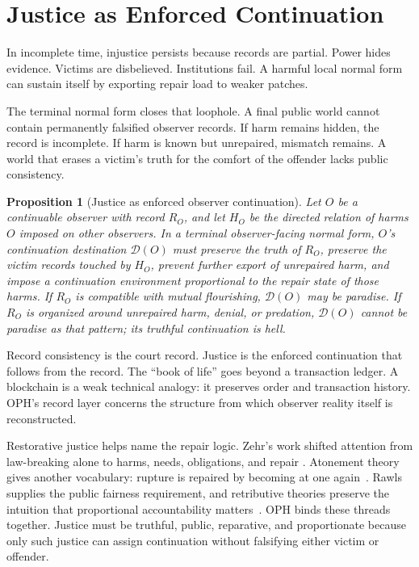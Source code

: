\documentclass[11pt]{article}
\newtheorem{proposition}[definition]{Proposition}
\theoremstyle{remark}
\theoremstyle{plain}
\newcommand{\Dest}{\mathcal D}
\begin{document}
\section{Justice as Enforced Continuation}

In incomplete time, injustice persists because records are partial. Power hides
evidence. Victims are disbelieved. Institutions fail. A harmful local normal
form can sustain itself by exporting repair load to weaker patches.

The terminal normal form closes that loophole. A final public world cannot
contain permanently falsified observer records. If harm remains hidden, the
record is incomplete. If harm is known but unrepaired, mismatch remains. A
world that erases a victim's truth for the comfort of the offender lacks public
consistency.

\begin{proposition}[Justice as enforced observer continuation]
Let \(O\) be a continuable observer with record \(R_O\), and let \(H_O\) be the
directed relation of harms \(O\) imposed on other observers. In a terminal
observer-facing normal form, \(O\)'s continuation destination \(\Dest(O)\) must
preserve the truth of \(R_O\), preserve the victim records touched by \(H_O\),
prevent further export of unrepaired harm, and impose a continuation
environment proportional to the repair state of those harms. If \(R_O\) is
compatible with mutual flourishing, \(\Dest(O)\) may be paradise. If \(R_O\) is
organized around unrepaired harm, denial, or predation, \(\Dest(O)\) cannot be
paradise as that pattern; its truthful continuation is hell.
\end{proposition}

Record consistency is the court record. Justice is the enforced continuation
that follows from the record. The ``book of life'' goes beyond a transaction
ledger. A blockchain is a weak technical analogy: it preserves
order and transaction history. OPH's
record layer concerns the structure from which observer reality itself is
reconstructed.

Restorative justice helps name the repair logic. Zehr's work shifted attention
from law-breaking alone to harms, needs, obligations, and repair
\cite{Zehr1990}. Atonement theory gives another vocabulary: rupture is repaired
by becoming at one again~\cite{SEPAtone}. Rawls supplies the public fairness
requirement, and retributive theories preserve the intuition that proportional
accountability matters~\cite{Rawls1971,SEPRetributive}. OPH binds these
threads together. Justice must be truthful, public, reparative, and
proportionate because only such justice can assign continuation without
falsifying either victim or offender.
\end{document}
